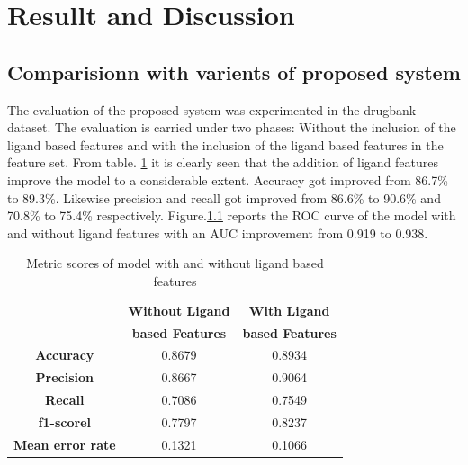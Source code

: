 \documentclass[conference]{IEEEtran}
\begin{document}
\section{Resullt and Discussion}

\subsection{Comparisionn with varients of proposed system}
The evaluation of the proposed system was experimented in the drugbank dataset. The evaluation is carried under two phases: Without the inclusion of the ligand based features and with the inclusion of the ligand based features in the feature set. From table. \ref{tab2} it is clearly seen that the addition of ligand features improve the model to a considerable extent. Accuracy got improved from 86.7\% to 89.3\%. Likewise precision and recall got improved from 86.6\% to 90.6\% and 70.8\% to 75.4\% respectively. Figure.\ref{} reports the ROC curve of the model with and without ligand features with an AUC improvement from 0.919 to 0.938.

\begin{table}[htbp]
\caption{Metric scores of model with and without ligand based features}
\begin{center}
\begin{tabular}{|c|c|c|}
\hline
&\textbf{Without Ligand}&\textbf{With Ligand} \\
&\textbf{based Features}&\textbf{based Features} \\
\hline
\textbf{Accuracy}&0.8679 & 0.8934 \\
\hline
\textbf{Precision}&0.8667 & 0.9064 \\
\hline
\textbf{Recall}& 0.7086 & 0.7549 \\
\hline
\textbf{f1-scorel}&0.7797 & 0.8237 \\
\hline
\textbf{Mean error rate}& 0.1321 & 0.1066 \\
\hline
\end{tabular}
\label{tab2}
\end{center}
\end{table}
\end{document}
